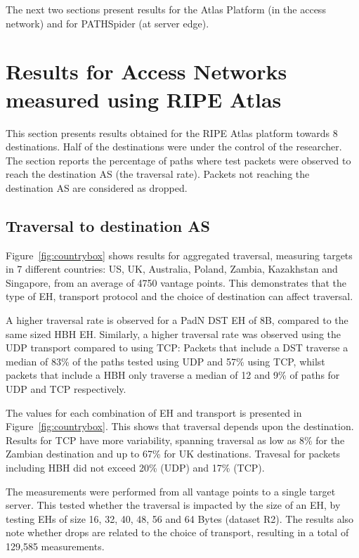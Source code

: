 \documentclass[conference]{IEEEtran}
\begin{document}
The next two sections present results for the Atlas Platform  (in the access network) and for PATHSpider (at server edge).

\section{Results for Access Networks measured using RIPE Atlas} 
\label{sec:ripe-results}

This section presents results obtained for the RIPE Atlas platform towards 8 destinations. Half of the destinations were under the control of the researcher. The section reports the percentage of paths where test packets were observed to reach the destination AS (the traversal rate). Packets not reaching the destination AS are considered as dropped. 

\subsection{Traversal to destination AS}

Figure~\ref{fig:countrybox} shows results for aggregated traversal, measuring targets in 7 different countries: US, UK, Australia, Poland, Zambia, Kazakhstan and Singapore, from an average of 4750 vantage points. This demonstrates that the type of EH, transport protocol and the choice of destination can affect traversal.

A higher traversal rate is observed for a PadN DST EH of 8B, compared to the same sized HBH EH. Similarly, a higher traversal rate was observed using the UDP transport compared to using TCP: Packets that include a DST traverse a median of 83\% of the paths tested using UDP and 57\% using TCP, whilst packets that include a HBH only traverse a median of 12 and 9\% of paths for UDP and TCP respectively.

The values for each combination of EH and transport is presented in Figure~\ref{fig:countrybox}. This shows that traversal depends upon the destination. Results for TCP have more variability, spanning traversal as low as 8\% for the Zambian destination and up to 67\% for UK destinations. Travesal for packets including HBH did not exceed 20\% (UDP) and 17\% (TCP).

The measurements were performed from all vantage points to a single target server. This tested whether the traversal is impacted by the size of an EH, by testing EHs of size 16, 32, 40, 48, 56 and 64 Bytes (dataset R2). The results also note whether drops are related to the choice of transport, resulting in a total of 129,585 measurements.
 
\end{document}
